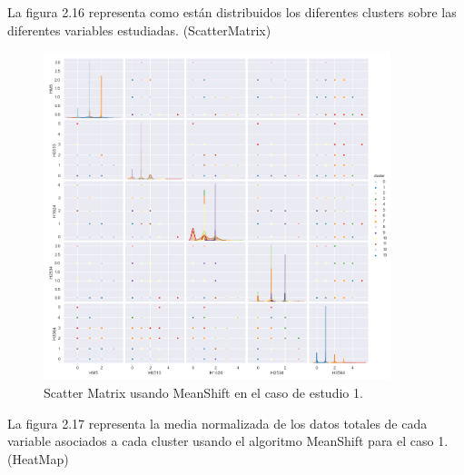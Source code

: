 
	La figura 2.16 representa como están distribuidos los diferentes clusters sobre las diferentes variables estudiadas. (ScatterMatrix)\\

	\begin{figure}[htb]
		\centering
		\includegraphics[width=0.9\textwidth]{./imagenes/caso1/scatterMatrix_caso1_MeanShift}
		\caption{Scatter Matrix usando MeanShift en el caso de estudio 1.} \label{fig:1}
	\end{figure}

	La figura 2.17 representa la media normalizada de los datos totales de cada variable asociados
	a cada cluster usando el algoritmo MeanShift para el caso 1. (HeatMap) \\

